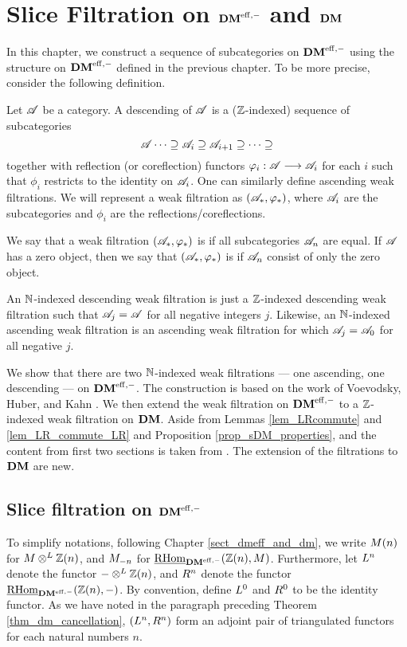 \newpage
\chapter{Slice Filtration on $\DMeff$ and $\DM$}\label{sect_slice_filt_dm}

In this chapter, we construct a sequence of subcategories on 
$\DMeff$ using the structure on $\DMeff$ defined in the previous
chapter. To be more precise, consider the following definition.

\begin{defn}\label{def_cat_filtration}
Let $\Cat{A}$ be a category. A descending  of 
$\Cat{A}$ is a ($\Z$-indexed) sequence of subcategories
\[
\Cat{A} \cdots \supseteq \Cat{A}_i \supseteq \Cat{A}_{i + 1}
   \supseteq \cdots \supseteq 
\]
together with reflection (or coreflection) functors $\phi_i: \Cat{A} \to 
\Cat{A}_i$ for each $i$ such that $\phi_i$ restricts to 
the identity on $\Cat{A}_i$. One can similarly define
ascending weak filtrations. We will represent a weak filtration
as $(\Cat{A}_*, \phi_*)$, where $\Cat{A}_i$ are the subcategories
and $\phi_i$ are the reflections/coreflections.

We say that a weak filtration $(\Cat{A}_*, \phi_*)$ is 
 if all subcategories $\Cat{A}_n$ are equal. If
$\Cat{A}$ has a zero object, then we say that $(\Cat{A}_*, \phi_*)$
is  if $\Cat{A}_n$ consist of only the zero object.
\end{defn}

\begin{rmk}
An $\N$-indexed descending weak filtration is just a $\Z$-indexed 
descending weak filtration such that $\Cat{A}_j = \Cat{A}$
for all negative integers $j$. Likewise, an $\N$-indexed ascending 
weak filtration is an ascending weak filtration for which
$\Cat{A}_j = \Cat{A}_0$ for all negative $j$.
\end{rmk}

We show that there are two $\N$-indexed weak filtrations --- 
one ascending, one descending --- on $\DMeff$. The construction 
is based on the work of Voevodsky, Huber, and Kahn \cite{HuKa}. 
We then extend the weak filtration on $\DMeff$ to a $\Z$-indexed
weak filtration on $\DM$. Aside from Lemmas \ref{lem_LRcommute} 
and \ref{lem_LR_commute_LR} and Proposition 
\ref{prop_sDM_properties}, and the content from first two sections 
is taken from \cite[\S 1]{HuKa}. The extension of the filtrations 
to $\DM$ are new.

\section{Slice filtration on $\DMeff$}
To simplify notations, following Chapter \ref{sect_dmeff_and_dm},
we write $\tZ[n]{M}$ for $M \tDM \Z(n)$, and $\hZ[n]{M}$ for 
$\ihomDMf(\Z(n), M)$. Furthermore, let $\LDMf{n}$ denote the
functor $- \tDM \Z(n)$, and $\RDMf{n}$ denote the functor 
$\ihomDMf(\Z(n), -)$. By convention, define $\LDMf{0}$ and 
$\RDMf{0}$ to be the identity functor. As we have noted in
the paragraph preceding Theorem \ref{thm_dm_cancellation}, 
$(\LDMf{n}, \RDMf{n})$ form an adjoint pair of triangulated 
functors for each natural numbers $n$.

